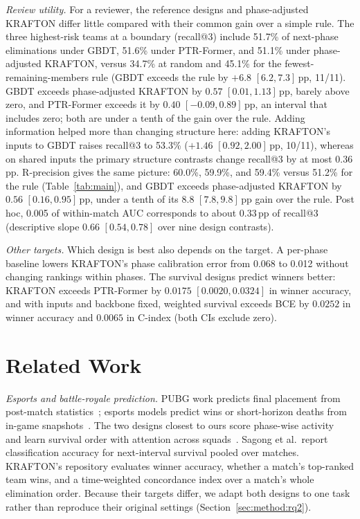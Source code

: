 \documentclass[sigconf,anonymous]{acmart}
\begin{document}
\emph{Review utility.} For a reviewer, the reference designs and phase-adjusted KRAFTON differ little compared with their common gain over a simple rule. The three highest-risk teams at a boundary (recall@3) include 51.7\% of next-phase eliminations under GBDT, 51.6\% under PTR-Former, and 51.1\% under phase-adjusted KRAFTON, versus 34.7\% at random and 45.1\% for the fewest-remaining-members rule (GBDT exceeds the rule by $+6.8$ $[6.2,\allowbreak 7.3]$\,pp, 11/11). GBDT exceeds phase-adjusted KRAFTON by $0.57$ $[0.01,\allowbreak 1.13]$\,pp, barely above zero, and PTR-Former exceeds it by $0.40$ $[-0.09,\allowbreak 0.89]$\,pp, an interval that includes zero; both are under a tenth of the gain over the rule. Adding information helped more than changing structure here: adding KRAFTON's inputs to GBDT raises recall@3 to 53.3\% ($+1.46$ $[0.92,\allowbreak 2.00]$\,pp, 10/11), whereas on shared inputs the primary structure contrasts change recall@3 by at most 0.36\,pp. R-precision gives the same picture: 60.0\%, 59.9\%, and 59.4\% versus 51.2\% for the rule (Table~\ref{tab:main}), and GBDT exceeds phase-adjusted KRAFTON by $0.56$ $[0.16,\allowbreak 0.95]$\,pp, under a tenth of its $8.8$ $[7.8,\allowbreak 9.8]$\,pp gain over the rule. Post hoc, 0.005 of within-match AUC corresponds to about 0.33\,pp of recall@3 (descriptive slope 0.66 $[0.54,\allowbreak 0.78]$ over nine design contrasts).

\emph{Other targets.} Which design is best also depends on the target. A per-phase baseline lowers KRAFTON's phase calibration error from 0.068 to 0.012 without changing rankings within phases. The survival designs predict winners better: KRAFTON exceeds PTR-Former by $0.0175$ $[0.0020,\allowbreak 0.0324]$ in winner accuracy, and with inputs and backbone fixed, weighted survival exceeds BCE by $0.0252$ in winner accuracy and $0.0065$ in C-index (both CIs exclude zero).

\section{Related Work}
\label{sec:related}
\emph{Esports and battle-royale prediction.} PUBG work predicts final placement from post-match statistics~\cite{KagglePUBG,LeeLee25}; esports models predict wins or short-horizon deaths from in-game snapshots~\cite{Hodge21,Katona19,Marshall22}. The two designs closest to ours score phase-wise activity~\cite{Sagong25a} and learn survival order with attention across squads~\cite{KRAFTON}. Sagong et al.\ report classification accuracy for next-interval survival pooled over matches. KRAFTON's repository evaluates winner accuracy, whether a match's top-ranked team wins, and a time-weighted concordance index over a match's whole elimination order. Because their targets differ, we adapt both designs to one task rather than reproduce their original settings (Section~\ref{sec:method:rq2}).
\end{document}
